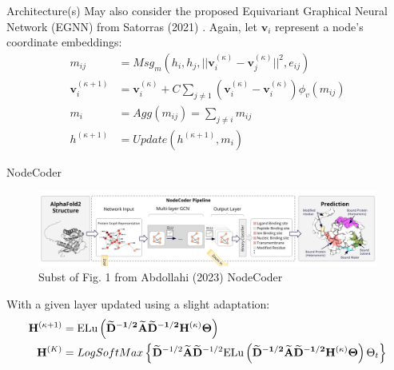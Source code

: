 \documentclass{beamer}
\newcommand{\node}{v}
\newcommand{\nrepresent}{h}
\newcommand{\NodeRepMat}{\mathbf{H}}
\newcommand{\edge}{e}
\newcommand{\DegMat}{\mathbf{D}}
\newcommand{\iter}{\kappa}
\newcommand{\Iter}{K}
\newcommand{\AdjMat}{\mathbf{A}}
\begin{document}
\begin{frame}{Architecture(s)}
    May also consider the proposed Equivariant Graphical Neural Network (EGNN) from Satorras (2021) \cite{satorras_en_2022}. Again, let $\mathbf{\node}_i$ represent a node's coordinate embeddings: 
        \begin{align*}
            m_{ij}
            &=
            Msg_m(\nrepresent_i, \nrepresent_j, ||\mathbf{\node}_i^{(\iter)}-\mathbf{\node}_j^{(\iter)}||^2, \edge_{ij}) 
        \\ 
            \mathbf{\node}_i^{(\iter+1)}
            &=
            \mathbf{\node}_i^{(\iter)}
            +
            C
            \sum_{j\neq 1}
            \left(
            \mathbf{\node}_i^{(\iter)}
            -
            \mathbf{\node}_i^{(\iter)}
            \right) 
            \phi_\node(m_{ij})
        \\
            m_i 
            &= 
            Agg(m_{ij})
            =
            \sum_{j\neq i} m_{ij}
        \\
            \nrepresent^{(\iter+1)}
            &=
            Update(\nrepresent^{(\iter+1)}, m_i)
        \end{align*}
    
\end{frame}

    
\begin{frame}{NodeCoder}
    \begin{figure}
        \centering 
        \includegraphics[scale=0.3]{Fig1_NodeCoder.png}
        \caption{Subst of Fig. 1 from Abdollahi (2023) NodeCoder \cite{abdollahi_nodecoder_2023}}
    \end{figure}

    With a given layer updated using a slight adaptation: 
    \begin{align*}
        \NodeRepMat^{(\iter+1)} 
        &=
        \text{ELu}
        \left( 
            \mathbf{
            \widetilde{\DegMat}^{-1/2}
            \widetilde{\AdjMat}
            \widetilde{\DegMat}^{-1/2}  
            \NodeRepMat^{(\iter)}
            \Theta 
            }            
        \right)
    \\
        \NodeRepMat^{(\Iter)} 
        &=
        LogSoftMax
        \left\{
        \widetilde{\DegMat}^{-1/2}
        \widetilde{\AdjMat}
        \widetilde{\DegMat}^{-1/2}  
        \text{ELu}
        \left( 
            \mathbf{
            \widetilde{\DegMat}^{-1/2}
            \widetilde{\AdjMat}
            \widetilde{\DegMat}^{-1/2}  
            \NodeRepMat^{(\iter)}
            \Theta 
            }            
        \right)
        \Theta_t
        \right\}
    \end{align*}
\end{frame}
\end{document}
